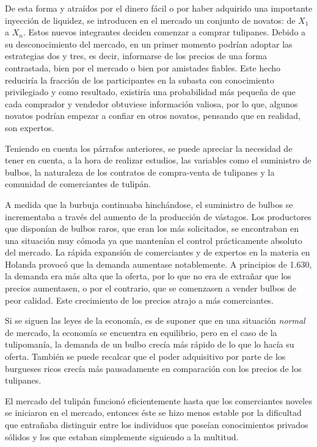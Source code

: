 De esta forma y atraídos por el dinero fácil o por haber adquirido una importante inyección de liquidez, se introducen en el mercado un conjunto de novatos: de $X_1$ a $X_n$. Estos nuevos integrantes deciden comenzar a comprar tulipanes. Debido a su desconocimiento del mercado, en un primer momento podrían adoptar las estrategias dos y tres, es decir, informarse de los precios de una forma contrastada, bien por el mercado o bien por amistades fiables. Este hecho reduciría la fracción de los participantes en la subasta con conocimiento privilegiado y como resultado, existiría una probabilidad más pequeña de que cada comprador y vendedor obtuviese información valiosa, por lo que, algunos novatos podrían empezar a confiar en otros novatos, pensando que en realidad, son expertos. 


Teniendo en cuenta los párrafos anteriores, se puede apreciar la necesidad de tener en cuenta, a la hora de realizar estudios, las variables como el suministro de bulbos, la naturaleza de los contratos de compra-venta de tulipanes y la comunidad de comerciantes de tulipán. 


A medida que la burbuja continuaba hinchándose, el suministro de bulbos se incrementaba a través del aumento de la producción de vástagos. Los productores que disponían de bulbos raros, que eran los más solicitados, se encontraban en una situación muy cómoda ya que mantenían el control prácticamente absoluto del mercado. La rápida expansión de comerciantes y de expertos en la materia en Holanda provocó que la demanda aumentase notablemente. A principios de 1.630, la demanda era más alta que la oferta, por lo que no era de extrañar que los precios aumentasen, o por el contrario, que se comenzasen a vender bulbos de peor calidad. Este crecimiento de los precios atrajo a más comerciantes.


Si se siguen las leyes de la economía, es de suponer que en una situación \emph{normal} de mercado, la economía se encuentra en equilibrio, pero en el caso de la tulipomanía, la demanda de un bulbo crecía más rápido de lo que lo hacía su oferta. También se puede recalcar que el poder adquisitivo por parte de los burgueses ricos crecía más pausadamente en comparación con los precios de los tulipanes. 


El mercado del tulipán funcionó eficientemente hasta que los comerciantes noveles se iniciaron en el mercado, entonces éste se hizo menos estable por la dificultad que entrañaba distinguir entre los individuos que poseían conocimientos privados sólidos y los que estaban simplemente siguiendo a la multitud.


